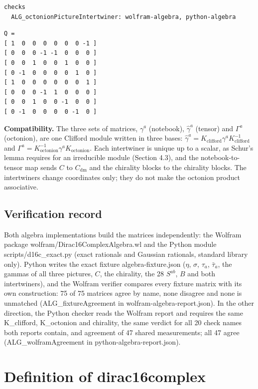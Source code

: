 \documentclass[11pt]{article}
\begin{document}
\begin{Verbatim}[fontsize=\small]
checks
  ALG_octonionPictureIntertwiner: wolfram-algebra, python-algebra
\end{Verbatim}

\begin{Verbatim}[fontsize=\small]
Q =
[ 1  0  0  0  0  0  0 -1 ]
[ 0  0  0 -1 -1  0  0  0 ]
[ 0  0  1  0  0  1  0  0 ]
[ 0 -1  0  0  0  0  1  0 ]
[ 1  0  0  0  0  0  0  1 ]
[ 0  0  0 -1  1  0  0  0 ]
[ 0  0  1  0  0 -1  0  0 ]
[ 0 -1  0  0  0  0 -1  0 ]
\end{Verbatim}

\textbf{Compatibility.} The three sets of matrices, $\gamma^a$ (notebook), $\hat\gamma^a$ (tensor) and $\Gamma^a$ (octonion), are one Clifford module written in three bases: $\hat\gamma^a=K_{\mathrm{clifford}}\gamma^aK_{\mathrm{clifford}}^{-1}$ and $\Gamma^a=K_{\mathrm{octonion}}^{-1}\gamma^aK_{\mathrm{octonion}}$. Each intertwiner is unique up to a scalar, as Schur's lemma requires for an irreducible module (Section 4.3), and the notebook-to-tensor map sends $C$ to $C_{\mathrm{dm}}$ and the chirality blocks to the chirality blocks. The intertwiners change coordinates only; they do not make the octonion product associative.

\subsection{Verification record}

Both algebra implementations build the matrices independently: the Wolfram package wolfram/Dirac16ComplexAlgebra.wl and the Python module scripts/d16c\_exact.py (exact rationals and Gaussian rationals, standard library only). Python writes the exact fixture algebra-fixture.json ($\eta$, $\sigma$, $\tau_a$, $\bar\tau_a$, the gammas of all three pictures, $C$, the chirality, the 28 $S^{ab}$, $B$ and both intertwiners), and the Wolfram verifier compares every fixture matrix with its own construction: 75 of 75 matrices agree by name, none disagree and none is unmatched (ALG\_fixtureAgreement in wolfram-algebra-report.json). In the other direction, the Python checker reads the Wolfram report and requires the same K\_clifford, K\_octonion and chirality, the same verdict for all 20 check names both reports contain, and agreement of 47 shared measurements; all 47 agree (ALG\_wolframAgreement in python-algebra-report.json).

\section{Definition of dirac16complex}
\end{document}
